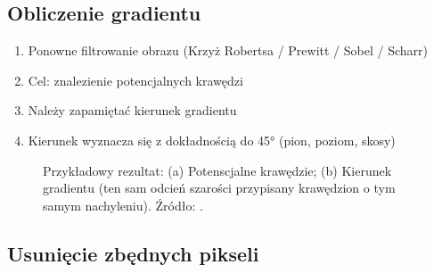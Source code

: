 \documentclass[a4paper,twocolumn,12pt]{article}
\begin{document}
\subsection{Obliczenie gradientu}

\begin{enumerate}
 \item Ponowne filtrowanie obrazu (Krzyż Robertsa / Prewitt / Sobel / Scharr)
 \item Cel: znalezienie potencjalnych krawędzi
 \item Należy zapamiętać kierunek gradientu
 \item Kierunek wyznacza się z dokładnością do 45° (pion, poziom, skosy)
\end{enumerate}

\begin{figure}[!ht]
 \begin{center}
 \end{center}
 \caption{
  Przykładowy rezultat:
  (a) Potenscjalne krawędzie;
  (b) Kierunek gradientu (ten sam odcień szarości przypisany krawędzion o tym samym nachyleniu).
  Źródło: \cite{boldak}.
 }
 \label{fig:canny_gradient}
\end{figure}


\subsection{Usunięcie zbędnych pikseli}
\end{document}
